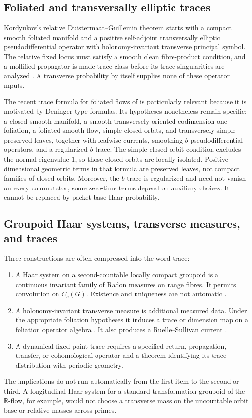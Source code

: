 \documentclass[11pt]{article}
\theoremstyle{definition}
\theoremstyle{remark}
\newcommand{\R}{\mathbb{R}}
\begin{document}
\subsection{Foliated and transversally elliptic traces}

Kordyukov's relative Duistermaat--Guillemin theorem starts with a compact
smooth foliated manifold and a positive self-adjoint transversally elliptic
pseudodifferential operator with holonomy-invariant transverse principal
symbol.  The relative fixed locus must satisfy a smooth clean fibre-product
condition, and a mollified propagator is made trace class before its trace
singularities are analyzed \citep{Kordyukov2000}.  A transverse probability
by itself supplies none of these operator inputs.

The recent trace formula for foliated flows of
\citet{AlvarezKordyukovLeichtnam2026} is particularly relevant because it is
motivated by Deninger-type formulas.  Its hypotheses nonetheless remain
specific: a closed smooth manifold, a smooth transversely oriented
codimension-one foliation, a foliated smooth flow, simple closed orbits, and
transversely simple preserved leaves, together with leafwise currents,
smoothing \(b\)-pseudodifferential operators, and a regularized \(b\)-trace.
The simple closed-orbit condition excludes the normal eigenvalue \(1\), so
those closed orbits are locally isolated.  Positive-dimensional geometric
terms in that formula are preserved leaves, not compact families of closed
orbits.  Moreover, the \(b\)-trace is regularized and need not vanish on every
commutator; some zero-time terms depend on auxiliary choices.  It cannot be
replaced by packet-base Haar probability.

\subsection{Groupoid Haar systems, transverse measures, and traces}

Three constructions are often compressed into the word trace:
\begin{enumerate}[leftmargin=*,itemsep=2pt]
 \item A Haar system on a second-countable locally compact groupoid is a
 continuous invariant family of Radon measures on range fibres.  It permits
 convolution on \(C_c(G)\).  Existence and uniqueness are not automatic
 \citep{Renault2006}.
 \item A holonomy-invariant transverse measure is additional measured data.
 Under the appropriate foliation hypotheses it induces a trace or dimension
 map on a foliation operator algebra \citep{Connes1982}.  It also produces a
 Ruelle--Sullivan current \citep{RuelleSullivan1975}.
 \item A dynamical fixed-point trace requires a specified return,
 propagation, transfer, or cohomological operator and a theorem identifying
 its trace distribution with periodic geometry.
\end{enumerate}
The implications do not run automatically from the first item to the second
or third.  A longitudinal Haar system for a standard transformation groupoid
of the \(\R\)-flow, for example, would not choose a transverse mass on the
uncountable orbit base or relative masses across primes.
\end{document}
